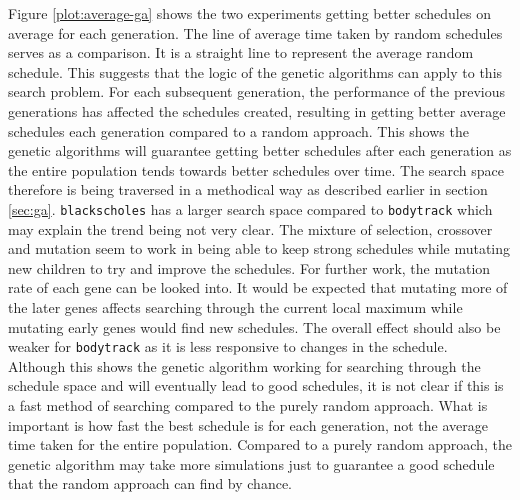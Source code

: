 \documentclass{article}
\newcommand{\n}[0]{\\[\baselineskip]}
\begin{document}
\noindent Figure \ref{plot:average-ga} shows the two experiments getting better schedules on average for each generation. The line of average time taken by random schedules serves as a comparison. It is a straight line to represent the average random schedule. This suggests that the logic of the genetic algorithms can apply to this search problem. For each subsequent generation, the performance of the previous generations has affected the schedules created, resulting in getting better average schedules each generation compared to a random approach. This shows the genetic algorithms will guarantee getting better schedules after each generation as the entire population tends towards better schedules over time. The search space therefore is being traversed in a methodical way as described earlier in section \ref{sec:ga}. \texttt{blackscholes} has a larger search space compared to \texttt{bodytrack} which may explain the trend being not very clear. The mixture of selection, crossover and mutation seem to work in being able to keep strong schedules while mutating new children to try and improve the schedules. For further work, the mutation rate of each gene can be looked into. It would be expected that mutating more of the later genes affects searching through the current local maximum while mutating early genes would find new schedules. The overall effect should also be weaker for \texttt{bodytrack} as it is less responsive to changes in the schedule.
\n
Although this shows the genetic algorithm working for searching through the schedule space and will eventually lead to good schedules, it is not clear if this is a fast method of searching compared to the purely random approach. What is important is how fast the best schedule is for each generation, not the average time taken for the entire population. Compared to a purely random approach, the genetic algorithm may take more simulations just to guarantee a good schedule that the random approach can find by chance.
\end{document}
